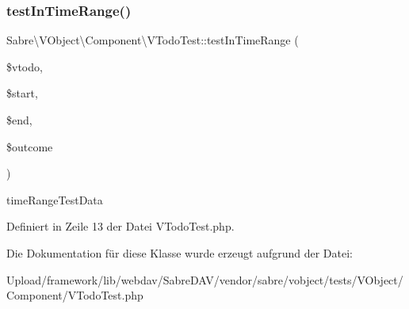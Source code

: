 \subsubsection{\texorpdfstring{test\+In\+Time\+Range()}{testInTimeRange()}}
{\footnotesize\ttfamily Sabre\textbackslash{}\+V\+Object\textbackslash{}\+Component\textbackslash{}\+V\+Todo\+Test\+::test\+In\+Time\+Range (\begin{DoxyParamCaption}\item[{\mbox{\hyperlink{class_sabre_1_1_v_object_1_1_component_1_1_v_todo}{V\+Todo}}}]{\$vtodo,  }\item[{}]{\$start,  }\item[{}]{\$end,  }\item[{}]{\$outcome }\end{DoxyParamCaption})}

time\+Range\+Test\+Data 

Definiert in Zeile 13 der Datei V\+Todo\+Test.\+php.



Die Dokumentation für diese Klasse wurde erzeugt aufgrund der Datei\+:\begin{DoxyCompactItemize}
\item 
Upload/framework/lib/webdav/\+Sabre\+D\+A\+V/vendor/sabre/vobject/tests/\+V\+Object/\+Component/V\+Todo\+Test.\+php\end{DoxyCompactItemize}
